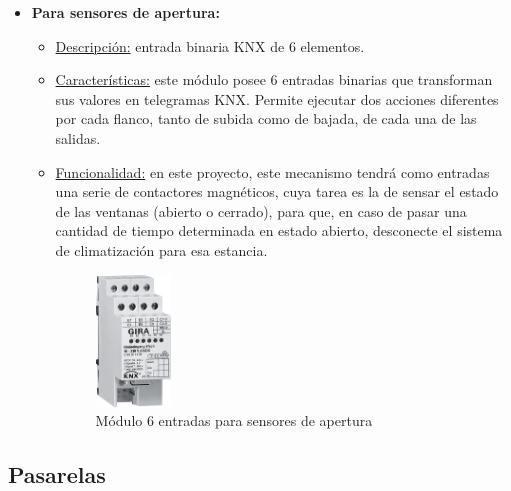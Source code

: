 \begin{itemize}
\item \textbf{Para sensores de apertura:} 
	\begin{itemize}
	\item\underline{Descripción:} entrada binaria KNX de 6 elementos.
	\item \underline{Características:} este módulo posee 6 entradas binarias que transforman sus valores en telegramas KNX. Permite ejecutar dos acciones diferentes por cada flanco, tanto de subida como de bajada, de cada una de las salidas.
	\item \underline{Funcionalidad:} en este proyecto, este mecanismo tendrá como entradas una serie de contactores magnéticos, cuya tarea es la de sensar el estado de las ventanas (abierto o cerrado), para que, en caso de pasar una cantidad de tiempo determinada en estado abierto, desconecte el sistema de climatización para esa estancia.
	\begin{figure}[H]
	\centering
	\includegraphics[width=0.2\textwidth]{figures/entradas_apertura.jpg}   
	\caption{Módulo 6 entradas para sensores de apertura}
	\label{fig:entradas_apertura}
	\end{figure}
	\end{itemize} 
\end{itemize} 

\subsection{Pasarelas}

